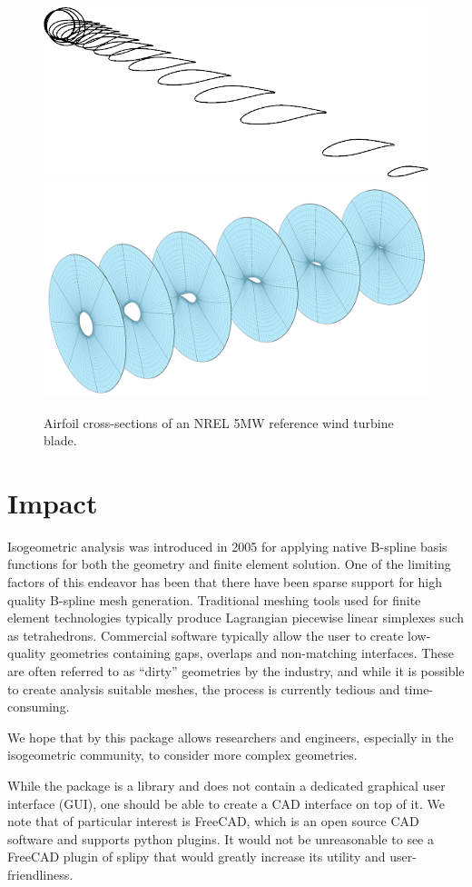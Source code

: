 \documentclass[preprint,12pt, a4paper]{elsarticle}
\begin{document}
\begin{figure}
  \begin{center}
    \includegraphics[width=.4\textwidth]{figs/airfoils}
    \includegraphics[width=.5\textwidth]{figs/crossecs2}
  \end{center}
  \caption{Airfoil cross-sections of an NREL 5MW reference wind turbine blade.}
  \label{fig:airfoils}
\end{figure}

\section{Impact}
\label{sec:impact}

Isogeometric analysis was introduced in 2005 \cite{hughes2005iac} for applying native B-spline basis functions for both the geometry and finite element solution.
One of the limiting factors of this endeavor has been that there have been sparse support for high quality B-spline mesh generation.
Traditional meshing tools used for finite element technologies typically produce Lagrangian piecewise linear simplexes such as tetrahedrons.
Commercial software typically allow the user to create low-quality geometries containing gaps, overlaps and non-matching interfaces.
These are often referred to as ``dirty'' geometries by the industry, and while it is possible to create analysis suitable meshes, the process is currently tedious and time-consuming.

We hope that by this package allows researchers and engineers, especially in the isogeometric community, to consider more complex geometries.

While the package is a library and does not contain a dedicated graphical user interface (GUI), one should be able to create a CAD interface on top of it.
We note that of particular interest is FreeCAD, which is an open source CAD software and supports python plugins.
It would not be unreasonable to see a FreeCAD plugin of splipy that would greatly increase its utility and user-friendliness.
\end{document}
